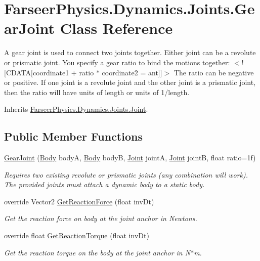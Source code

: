 \hypertarget{class_farseer_physics_1_1_dynamics_1_1_joints_1_1_gear_joint}{\section{Farseer\+Physics.\+Dynamics.\+Joints.\+Gear\+Joint Class Reference}
\label{class_farseer_physics_1_1_dynamics_1_1_joints_1_1_gear_joint}
}


A gear joint is used to connect two joints together. Either joint can be a revolute or prismatic joint. You specify a gear ratio to bind the motions together\+: $<$!\mbox{[}C\+D\+A\+T\+A\mbox{[}coordinate1 + ratio $\ast$ coordinate2 = ant\mbox{]}\mbox{]}$>$ The ratio can be negative or positive. If one joint is a revolute joint and the other joint is a prismatic joint, then the ratio will have units of length or units of 1/length.  




Inherits \hyperlink{class_farseer_physics_1_1_dynamics_1_1_joints_1_1_joint}{Farseer\+Physics.\+Dynamics.\+Joints.\+Joint}.

\subsection*{Public Member Functions}
\begin{DoxyCompactItemize}
\item 
\hyperlink{class_farseer_physics_1_1_dynamics_1_1_joints_1_1_gear_joint_a7949ee1aa25d492908f972225774ad4e}{Gear\+Joint} (\hyperlink{class_farseer_physics_1_1_dynamics_1_1_body}{Body} body\+A, \hyperlink{class_farseer_physics_1_1_dynamics_1_1_body}{Body} body\+B, \hyperlink{class_farseer_physics_1_1_dynamics_1_1_joints_1_1_joint}{Joint} joint\+A, \hyperlink{class_farseer_physics_1_1_dynamics_1_1_joints_1_1_joint}{Joint} joint\+B, float ratio=1f)
\begin{DoxyCompactList}\small\item\em Requires two existing revolute or prismatic joints (any combination will work). The provided joints must attach a dynamic body to a static body. \end{DoxyCompactList}\item 
override Vector2 \hyperlink{class_farseer_physics_1_1_dynamics_1_1_joints_1_1_gear_joint_a0bc5fda4f33a81ab1598d56a5d7dcabf}{Get\+Reaction\+Force} (float inv\+Dt)
\begin{DoxyCompactList}\small\item\em Get the reaction force on body at the joint anchor in Newtons. \end{DoxyCompactList}\item 
override float \hyperlink{class_farseer_physics_1_1_dynamics_1_1_joints_1_1_gear_joint_a2b2c491c28382b3c53445e5990e23e61}{Get\+Reaction\+Torque} (float inv\+Dt)
\begin{DoxyCompactList}\small\item\em Get the reaction torque on the body at the joint anchor in N$\ast$m. \end{DoxyCompactList}\end{DoxyCompactItemize}
